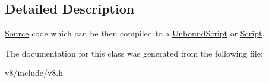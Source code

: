 \subsection{Detailed Description}
\hyperlink{classv8_1_1ScriptCompiler_1_1Source}{Source} code which can be then compiled to a \hyperlink{classv8_1_1UnboundScript}{Unbound\+Script} or \hyperlink{classv8_1_1Script}{Script}. 

The documentation for this class was generated from the following file\+:\begin{DoxyCompactItemize}
\item 
v8/include/v8.\+h\end{DoxyCompactItemize}
